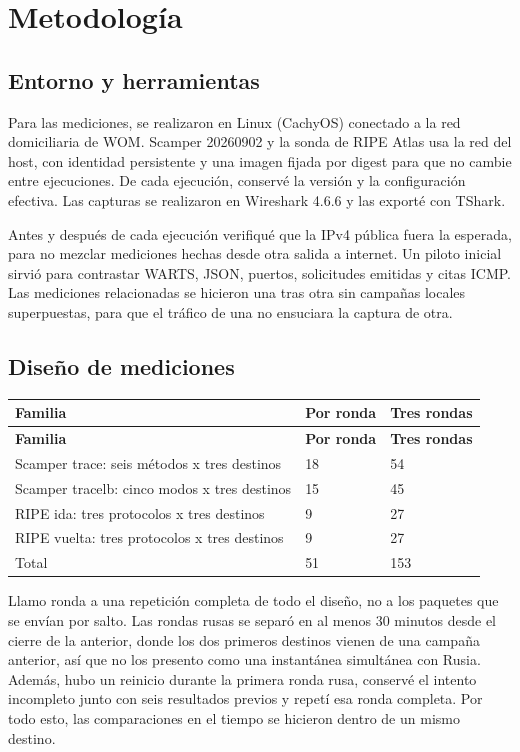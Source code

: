 \section{Metodología}\label{sec:metodo}

\subsection{Entorno y herramientas}

Para las mediciones, se realizaron en Linux (CachyOS) conectado a la red domiciliaria de WOM. Scamper 20260902 y la sonda de RIPE Atlas usa la red del host, con identidad persistente y una imagen fijada por digest para que no cambie entre ejecuciones. De cada ejecución, conservé la versión y la configuración efectiva. Las capturas se realizaron en Wireshark 4.6.6 y las exporté con TShark.

Antes y después de cada ejecución verifiqué que la IPv4 pública fuera la esperada, para no mezclar mediciones hechas desde otra salida a internet. Un piloto inicial sirvió para contrastar WARTS, JSON, puertos, solicitudes emitidas y citas ICMP. Las mediciones relacionadas se hicieron una tras otra sin campañas locales superpuestas, para que el tráfico de una no ensuciara la captura de otra.


\subsection{Diseño de mediciones}
\begingroup
\fontsize{9}{11}\selectfont
\addtocounter{table}{-1}
\begin{longtable}{p{10cm}p{2cm}p{2cm}}
\toprule
\textbf{Familia} & \textbf{Por ronda} & \textbf{Tres rondas} \\ \midrule
\endfirsthead
\toprule
\textbf{Familia} & \textbf{Por ronda} & \textbf{Tres rondas} \\ \midrule
\endhead
Scamper trace: seis métodos x tres destinos & 18 & 54 \\
Scamper tracelb: cinco modos x tres destinos & 15 & 45 \\
RIPE ida: tres protocolos x tres destinos & 9 & 27 \\
RIPE vuelta: tres protocolos x tres destinos & 9 & 27 \\
Total & 51 & 153 \\
\bottomrule
\end{longtable}
\endgroup

Llamo ronda a una repetición completa de todo el diseño, no a los paquetes que se envían por salto. Las rondas rusas se separó en al menos 30 minutos desde el cierre de la anterior, donde los dos primeros destinos vienen de una campaña anterior, así que no los presento como una instantánea simultánea con Rusia. Además, hubo un reinicio durante la primera ronda rusa, conservé el intento incompleto junto con seis resultados previos y repetí esa ronda completa. Por todo esto, las comparaciones en el tiempo se hicieron dentro de un mismo destino.


